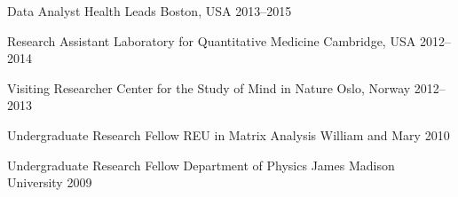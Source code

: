 

\begin{cventries}

  \cventry
    {Data Analyst} %
    {Health Leads} %
    {Boston, USA} %
    {2013--2015} %
    {}

  \cventry
    {Research Assistant} %
    {Laboratory for Quantitative Medicine} %
    {Cambridge, USA} %
    {2012--2014} %
    {}

  \cventry
    {Visiting Researcher} %
    {Center for the Study of Mind in Nature} %
    {Oslo, Norway} %
    {2012--2013} %
    {}

  \cventry
    {Undergraduate Research Fellow} %
    {REU in Matrix Analysis} %
    {William and Mary} %
    {2010} %
    {}
    
  \cventry
    {Undergraduate Research Fellow} %
    {Department of Physics} %
    {James Madison University} %
    {2009} %
    {}


\end{cventries}
